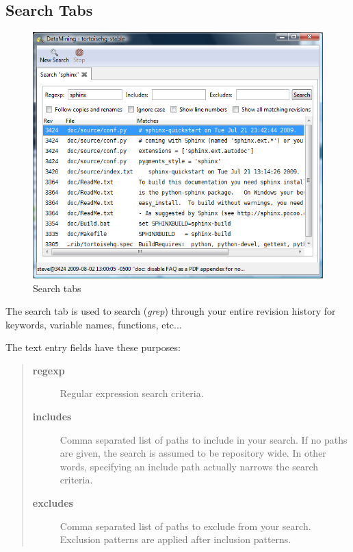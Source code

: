 \documentclass[letterpaper,10pt,english]{manual}
\begin{document}
\subsection{Search Tabs}
\begin{figure}[htbp]
\centering

\includegraphics{search.png}
\caption{Search tabs}\end{figure}

The search tab is used to search (\emph{grep}) through your entire revision
history for keywords, variable names, functions, etc...

The text entry fields have these purposes:
\begin{quote}
\begin{description}
\item[\textbf{regexp}]
Regular expression search criteria.

\item[\textbf{includes}]
Comma separated list of paths to include in your search. If no
paths are given, the search is assumed to be repository wide. In
other words, specifying an include path actually narrows the
search criteria.

\item[\textbf{excludes}]
Comma separated list of paths to exclude from your search.
Exclusion patterns are applied after inclusion patterns.

\end{description}
\end{quote}
\end{document}
